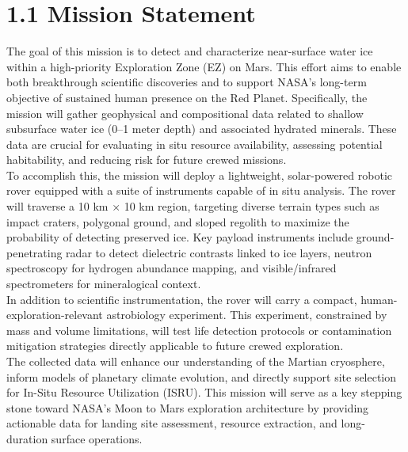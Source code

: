 \section*{1.1 Mission Statement}

The goal of this mission is to detect and characterize near-surface water ice within a high-priority Exploration Zone (EZ) on Mars. This effort aims to enable both breakthrough scientific discoveries and to support NASA's long-term objective of sustained human presence on the Red Planet. Specifically, the mission will gather geophysical and compositional data related to shallow subsurface water ice (0–1 meter depth) and associated hydrated minerals. These data are crucial for evaluating in situ resource availability, assessing potential habitability, and reducing risk for future crewed missions. \\

To accomplish this, the mission will deploy a lightweight, solar-powered robotic rover equipped with a suite of instruments capable of in situ analysis. The rover will traverse a 10 km × 10 km region, targeting diverse terrain types such as impact craters, polygonal ground, and sloped regolith to maximize the probability of detecting preserved ice. Key payload instruments include ground-penetrating radar to detect dielectric contrasts linked to ice layers, neutron spectroscopy for hydrogen abundance mapping, and visible/infrared spectrometers for mineralogical context. \\

In addition to scientific instrumentation, the rover will carry a compact, human-exploration-relevant astrobiology experiment. This experiment, constrained by mass and volume limitations, will test life detection protocols or contamination mitigation strategies directly applicable to future crewed exploration. \\

The collected data will enhance our understanding of the Martian cryosphere, inform models of planetary climate evolution, and directly support site selection for In-Situ Resource Utilization (ISRU). This mission will serve as a key stepping stone toward NASA’s Moon to Mars exploration architecture by providing actionable data for landing site assessment, resource extraction, and long-duration surface operations. \\